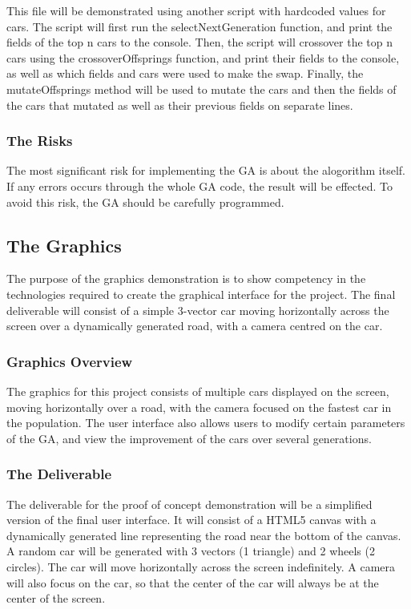 \documentclass{article}
\begin{document}
This file will be demonstrated using another script with hardcoded values for 
cars. The script will first run the selectNextGeneration function, and print the 
fields of the top n cars to the console. Then, the script will crossover the top 
n cars using the crossoverOffsprings function, and print their fields to the 
console, as well as which fields and cars were used to make the swap. Finally, 
the mutateOffsprings method will be used to mutate the cars and then the fields 
of the cars that mutated as well as their previous fields on separate lines.

\subsubsection{The Risks}
The most significant risk for implementing the GA is about the alogorithm 
itself. If any errors occurs through the whole GA code, the result will be 
effected. To avoid this risk, the GA should be carefully programmed.

\subsection{The Graphics}
The purpose of the graphics demonstration is to show competency in the 
technologies required to create the graphical interface for the project. The 
final deliverable will consist of a simple 3-vector car moving horizontally 
across the screen over a dynamically generated road, with a camera centred on 
the car.

\subsubsection{Graphics Overview}
The graphics for this project consists of multiple cars displayed on the screen, 
moving horizontally over a road, with the camera focused on the fastest car in 
the population. The user interface also allows users to modify certain 
parameters of the GA, and view the improvement of the cars over several 
generations. 

\subsubsection{The Deliverable}
The deliverable for the proof of concept demonstration will be a simplified 
version of the final user interface. It will consist of a HTML5 canvas with a 
dynamically generated line representing the road near the bottom of the canvas. 
A random car will be generated with 3 vectors (1 triangle) and 2 wheels (2 
circles). The car will move horizontally across the screen indefinitely. A 
camera will also focus on the car, so that the center of the car will always be 
at the center of the screen.
\end{document}
